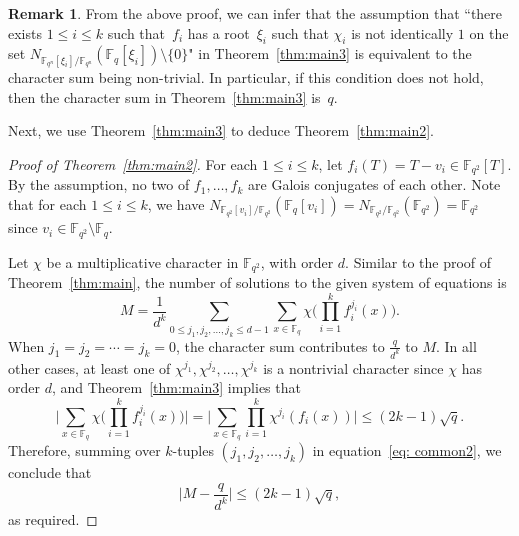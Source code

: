 \documentclass[12pt,reqno]{amsart}
\theoremstyle{definition}
\newtheorem{rem}[thm]{Remark}
\newcommand{\F}{\mathbb{F}}
\begin{document}
\begin{rem}\label{rem:trivial}
From the above proof, we can infer that the assumption that ``there exists $1\leq i \leq k$ such that~$f_i$ has a root~$\xi_i$ such that $\chi_i$ is not identically $1$ on the set $N_{\F_{q^n}[\xi_i]/\F_{q^n}}(\F_q[\xi_i]) \setminus \{0\}$" in Theorem~\ref{thm:main3} is equivalent to the character sum being non-trivial. In particular, if this condition does not hold, then the character sum in Theorem~\ref{thm:main3} is~$q$. %
\end{rem}

Next, we use Theorem~\ref{thm:main3} to deduce Theorem~\ref{thm:main2}.

\begin{proof}[Proof of Theorem~\ref{thm:main2}]

For each $1 \leq i \leq k$, let $f_i(T)=T-v_i \in \F_{q^2}[T]$. By the assumption, no two of $f_1,\ldots, f_k$ are Galois conjugates of each other. Note that for each $1 \leq i \leq k$, we have $N_{\F_{q^2}[v_i]/\F_{q^2}}(\F_q[v_i])=N_{\F_{q^2}/\F_{q^2}}(\F_{q^2})=\F_{q^2}$ since $v_i \in \F_{q^2} \setminus \F_q$. 


Let $\chi$ be a multiplicative character in $\F_{q^2}$, with order $d$. 
Similar to the proof of Theorem~\ref{thm:main}, the number of solutions to the given system of equations is
\begin{equation} \label{eq: common2}
 M=\frac{1}{d^k} \sum_{0 \leq j_1, j_2, \ldots, j_k \leq d-1}\sum_{x \in \F_q} \chi\bigg(\prod_{i=1}^k f_i^{j_i}(x)\bigg).   
\end{equation}  
When $j_1=j_2=\cdots=j_k=0$, the character sum contributes to $\frac{q}{d^k}$ to $M$. In all other cases, at least one of $\chi^{j_1},\chi^{j_2}, \ldots, \chi^{j_k}$ is a nontrivial character since $\chi$ has order $d$, and Theorem~\ref{thm:main3} implies that
$$
\bigg|\sum_{x \in \F_q} \chi\bigg(\prod_{i=1}^k f_i^{j_i}(x)\bigg)\bigg|=\bigg|\sum_{x \in \F_q} \prod_{i=1}^k \chi^{j_i} (f_i(x))\bigg|\leq (2k-1)\sqrt{q}.
$$
Therefore, summing over $k$-tuples $(j_1,j_2, \ldots, j_k)$ in equation~\eqref{eq: common2}, we conclude that
$$
\bigg|M-\frac{q}{d^k}\bigg|\leq (2k-1)\sqrt{q},
$$
as required.
\end{proof}
\end{document}
